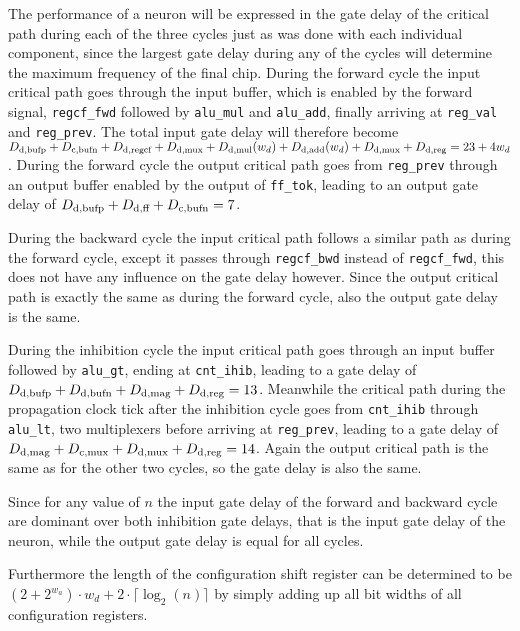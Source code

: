 The performance of a neuron will be expressed in the gate delay of the critical path during each of the three cycles just as was done with each individual component, since the largest gate delay during any of the cycles will determine the maximum frequency of the final chip. During the forward cycle the input critical path goes through the input buffer, which is enabled by the forward signal, \texttt{regcf\_fwd} followed by \texttt{alu\_mul} and \texttt{alu\_add}, finally arriving at \texttt{reg\_val} and \texttt{reg\_prev}. The total input gate delay will therefore become $\f{D}{d}{bufp} + \f{D}{c}{bufn} + \f{D}{d}{regcf} + \f{D}{d}{mux} + \f{D}{d}{mul}(w_{d}) + \f{D}{d}{add}(w_{d}) + \f{D}{d}{mux} + \f{D}{d}{reg} = 23 + 4w_{d}$. During the forward cycle the output critical path goes from \texttt{reg\_prev} through an output buffer enabled by the output of \texttt{ff\_tok}, leading to an output gate delay of $\f{D}{d}{bufp} + \f{D}{d}{ff} + \f{D}{c}{bufn} = 7$.

During the backward cycle the input critical path follows a similar path as during the forward cycle, except it passes through \texttt{regcf\_bwd} instead of \texttt{regcf\_fwd}, this does not have any influence on the gate delay however. Since the output critical path is exactly the same as during the forward cycle, also the output gate delay is the same.

During the inhibition cycle the input critical path goes through an input buffer followed by \texttt{alu\_gt}, ending at \texttt{cnt\_ihib}, leading to a gate delay of $\f{D}{d}{bufp} + \f{D}{d}{bufn} + \f{D}{d}{mag} + \f{D}{d}{reg} = 13$. Meanwhile the critical path during the propagation clock tick after the inhibition cycle goes from \texttt{cnt\_ihib} through \texttt{alu\_lt}, two multiplexers before arriving at \texttt{reg\_prev}, leading to a gate delay of $\f{D}{d}{mag} + \f{D}{c}{mux} + \f{D}{d}{mux} + \f{D}{d}{reg} = 14$. Again the output critical path is the same as for the other two cycles, so the gate delay is also the same.

Since for any value of $n$ the input gate delay of the forward and backward cycle are dominant over both inhibition gate delays, that is the input gate delay of the neuron, while the output gate delay is equal for all cycles.

Furthermore the length of the configuration shift register can be determined to be $(2 + 2^{w_{a}}) \cdot w_{d} + 2 \cdot \lceil\log_{2}(n)\rceil$ by simply adding up all bit widths of all configuration registers.

